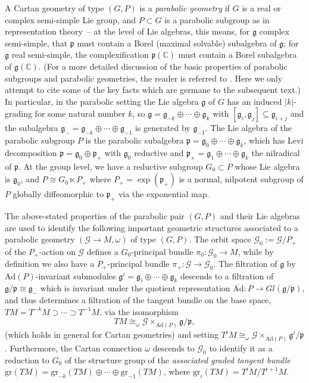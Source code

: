 \documentclass[pdftex]{sigma}
\def\C{\mathbb{C}}
\def\g{\mathfrak{g}}
\def\p{\mathfrak{p}}
\def\Gbdle{\mathcal{G}}
\def\dsum{\oplus}
\def\isom{\cong}
\theoremstyle{plain}
\theoremstyle{definition}
\begin{document}
A Cartan geometry of type $(G,P)$ is a \emph{parabolic geometry} if $G$ is a real or complex semi-simple Lie group, and $P \subset G$ is a parabolic subgroup as in representation theory~-- at the level of Lie algebras, this means, for $\g$ complex semi-simple, that $\p$ must contain a Borel (maximal solvable) subalgebra of $\g$; for $\g$ real semi-simple, the complexif\/ication $\p(\C)$ must contain a Borel subalgebra of $\g(\C)$. (For a more detailed discussion of the basic properties of parabolic subgroups and parabolic geometries, the reader is referred to \cite{CSbook}. Here we only attempt to cite some of the key facts which are germane to the subsequent text.) In particular, in the parabolic setting the Lie algebra $\g$ of $G$ has an induced $\vert k \vert$-grading for some natural number $k$, so $\g = \g_{-k} \dsum \cdots \dsum \g_k$ with $[\g_i,\g_j] \subseteq \g_{i+j}$ and the subalgebra $\g_- = \g_{-k} \dsum \cdots \dsum \g_{-1}$ is generated by $\g_{-1}$. The Lie algebra of the parabolic subgroup $P$ is the parabolic subalgebra $\p = \g_0 \dsum \cdots \dsum \g_{k}$, which has Levi decomposition $\p = \g_0 \dsum \p_+$ with $\g_0$ reductive and $\p_+ = \g_1 \dsum \cdots \dsum \g_k$ the nilradical of $\p$. At the group level, we have a reductive subgroup $G_0 \subset P$ whose Lie algebra is $\g_0$, and $P \isom G_0 \ltimes P_+$ where $P_+ = \exp (\p_+)$ is a normal, nilpotent subgroup of $P$ globally dif\/feomorphic to $\p_+$ via the exponential map.

The above-stated properties of the parabolic pair $(G,P)$ and their Lie algebras are used to identify the following important geometric structures associated to a parabolic geometry $(\Gbdle \rightarrow M,\omega)$ of type $(G,P)$. The orbit space $\Gbdle_0 := \Gbdle/P_+$ of the $P_+$-action on $\Gbdle$ def\/ines a $G_0$-principal bundle $\pi_0: \Gbdle_0 \rightarrow M$, while by def\/inition we also have a $P_+$-principal bundle $\pi_+: \Gbdle \rightarrow \Gbdle_0$. The f\/iltration of $\g$ by $\mathrm{Ad}(P)$-invariant submodules $\g^i = \g_i \dsum \cdots \dsum \g_k$ descends to a f\/iltration of $\g/\p \isom \g_-$ which is invariant under the quotient representation $\overline{\mathrm{Ad}}: P \rightarrow Gl(\g/\p)$, and thus determines a f\/iltration of the tangent bundle on the base space, $TM = T^{-k}M \supset \cdots \supset T^{-1}M$, via the isomorphism
\[
TM \isom_{\omega} \Gbdle \times_{\overline{\mathrm{Ad}}(P)} \g/\p,
\]
(which holds in general for Cartan geometries) and setting $T^iM \isom_{\omega} \Gbdle \times_{\overline{\mathrm{Ad}}(P)} \g^i/\p$. Furthermore, the Cartan connection $\omega$ descends to $\Gbdle_0$ to identify it as a reduction to $G_0$ of the structure group of the \emph{associated graded tangent bundle} $\mathrm{gr}(TM) = \mathrm{gr}_{-k}(TM) \dsum \cdots \dsum \mathrm{gr}_{-1}(TM)$, where $\mathrm{gr}_i(TM) = T^iM/T^{i+1}M$.
\end{document}
